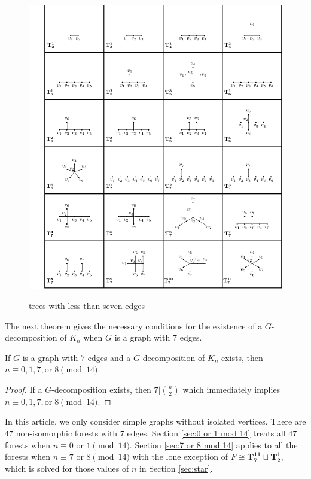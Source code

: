 \begin{figure}[H]
\centering
\includegraphics{standalone/tree chart.pdf}
\label{fig:catalog}
\caption{trees with less than seven edges}
\end{figure}

The next theorem gives the necessary conditions for the existence of a $G$-decomposition of $K_n$ when $G$ is a graph with 7 edges.

\begin{thm}

  If $G$ is a graph with $7$ edges and a $G$-decomposition of $K_n$ exists, then $n \equiv 0,1,7, \textrm{or} \; 8 \pmod{14}.$

\end{thm}

\begin{proof}

    If a $G$-decomposition exists, then $7|\binom{n}{2}$ which immediately implies $n \equiv 0,1,7, \textrm{or} \; 8 \pmod{14}.$

\end{proof}

In this article, we only consider simple graphs without isolated vertices. There are $47$ non-isomorphic forests with $7$ edges. Section \ref{sec:0 or 1 mod 14} treats all $47$ forests when $n \equiv 0 \textrm{ or } 1 \pmod{14}$. Section \ref{sec:7 or 8 mod 14} applies to all the forests when $n \equiv 7 \textrm{ or } 8 \pmod{14}$ with the lone exception of $F \cong \mathbf{T_{7}^{11}}\sqcup\mathbf{T_{2}^{1}},$ which is solved for those values of $n$ in Section \ref{sec:star}. 

